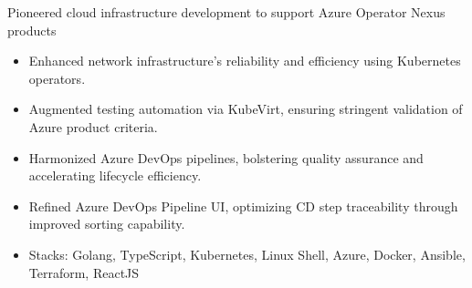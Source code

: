 \documentclass{resume}
\begin{document}
Pioneered cloud infrastructure development to support Azure Operator Nexus products
\begin{itemize}
  \item Enhanced network infrastructure's reliability and efficiency using Kubernetes operators.
  \item Augmented testing automation via KubeVirt, ensuring stringent validation of Azure product criteria.
  \item Harmonized Azure DevOps pipelines, bolstering quality assurance and accelerating lifecycle efficiency.
  \item Refined Azure DevOps Pipeline UI, optimizing CD step traceability through improved sorting capability.
  \item Stacks: Golang, TypeScript, Kubernetes, Linux Shell, Azure, Docker, Ansible, Terraform, ReactJS
\end{itemize}
\end{document}
